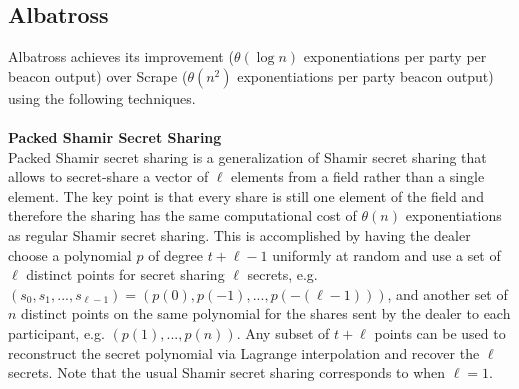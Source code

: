 \documentclass[letterpaper,twocolumn,10pt]{article}
\theoremstyle{definition}
\theoremstyle{remark}
\begin{document}
\subsection {Albatross}
\label{appendix:albatross}
Albatross achieves its improvement ($\theta(\log n)$ exponentiations per party per beacon output) over Scrape ($\theta(n^2)$ exponentiations per party beacon output) using the following techniques.\\\\
\noindent\textbf{Packed Shamir Secret Sharing} \\
Packed Shamir secret sharing is a generalization of Shamir secret sharing that allows to secret-share a vector of $\ell$ elements from a field rather than a single element. The key point is that every share is still one element of the field and therefore the sharing has the same computational cost of $\theta(n)$ exponentiations as regular Shamir secret sharing. This is accomplished by having the dealer choose a polynomial $p$ of degree $t+\ell-1$ uniformly at random and use a set of $\ell$ distinct points for secret sharing $\ell$ secrets, e.g. $(s_0, s_1, ..., s_{\ell - 1}) = (p(0), p(-1), ..., p(-(\ell - 1)))$, and another set of $n$ distinct points on the same polynomial for the shares sent by the dealer to each participant, e.g. $(p(1), ..., p(n))$. Any subset of $t+\ell$ points can be used to reconstruct the secret polynomial via Lagrange interpolation and recover the $\ell$ secrets. Note that the usual Shamir secret sharing corresponds to when $\ell = 1$.\\
\end{document}
